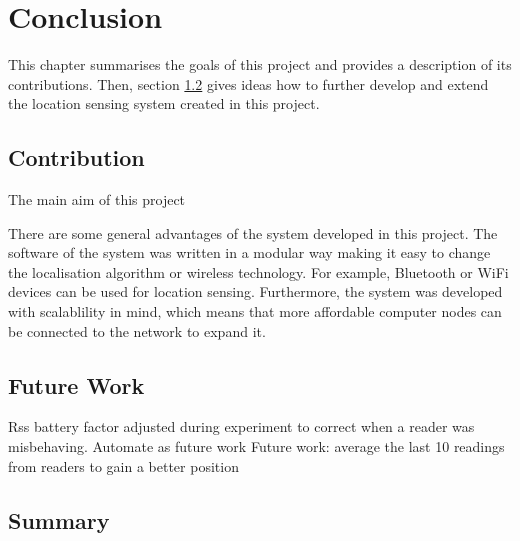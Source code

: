 \chapter{Conclusion}
\label{ch:conclusion}

This chapter summarises the goals of this project and provides a description of its contributions. Then, section \ref{sec:future} gives ideas how to further develop and extend the location sensing system created in this project.

\section{Contribution}

The main aim of this project 

There are some general advantages of the system developed in this project. The software of the system was written in a modular way making it easy to change the localisation algorithm or wireless technology. For example, Bluetooth or WiFi devices can be used for location sensing. Furthermore, the system was developed with scalablility in mind, which means that more affordable computer nodes can be connected to the network to expand it.  

\section{Future Work}
\label{sec:future}

Rss battery factor adjusted during experiment to correct when a reader was misbehaving. Automate as future work
Future work: average the last 10 readings from readers to gain a better position

\section{Summary}
